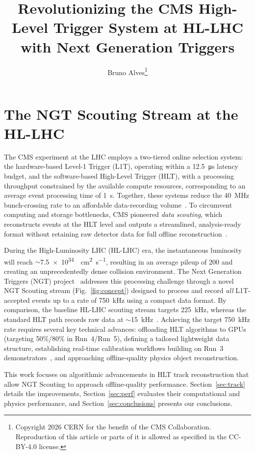 \documentclass[a4paper,11pt]{article}
\title{Revolutionizing the CMS High-Level Trigger System at HL-LHC with Next Generation Triggers}
\author[a]{Bruno Alves\orcidlink{0000-0001-9752-0624}\footnote{Copyright 2026 CERN for the benefit of the CMS Collaboration. Reproduction of this article or parts of it is allowed as specified in the CC-BY-4.0 license.}}
\affiliation[a]{CERN, 1211 Geneva 23, Switzerland}
\newcommand{\sm}{\ensuremath{\sim}}
\begin{document}
\maketitle

\section{The NGT Scouting Stream at the HL-LHC}
\label{intro}

The CMS experiment at the LHC employs a two-tiered online selection system: the hardware-based Level-1 Trigger (L1T), operating within a \SI{12.5}{\micro\second} latency budget, and the software-based High-Level Trigger (HLT), with a processing throughput constrained by the available compute resources, corresponding to an average event processing time of \SI{1}{\second}.
Together, these systems reduce the \SI{40}{\mega\hertz} bunch-crossing rate to an affordable data-recording volume~\cite{cms}.
To circumvent computing and storage bottlenecks, CMS pioneered \textit{data scouting}, which reconstructs events at the HLT level and outputs a streamlined, analysis-ready format without retaining raw detector data for full offline reconstruction~\cite{scout}. \par

During the High-Luminosity LHC (HL-LHC) era, the instantaneous luminosity will reach \sm\SI{7.5e34}{\per\square\centi\meter\per\second}, resulting in an average pileup of 200 and creating an unprecedentedly dense collision environment.
The Next Generation Triggers (NGT) project~\cite{ngt} addresses this processing challenge through a novel NGT Scouting stream (Fig.~\ref{fig:concept}) designed to process and record \emph{all} L1T-accepted events up to a rate of \SI{750}{\kilo\hertz} using a compact data format.
By comparison, the baseline HL-LHC scouting stream targets \SI{225}{\kilo\hertz}, whereas the standard HLT path records raw data at \sm\SI{15}{\kilo\hertz}~\cite{octdr}.
Achieving the target \SI{750}{\kilo\hertz} rate requires several key technical advances: offloading HLT algorithms to GPUs (targeting 50\%/80\% in Run~4/Run~5), defining a tailored lightweight data structure, establishing real-time calibration workflows building on Run~3 demonstrators~\cite{demonstrator}, and approaching offline-quality physics object reconstruction. \par

This work focuses on algorithmic advancements in HLT track reconstruction that allow NGT Scouting to approach offline-quality performance.
Section~\ref{sec:track} details the improvements, Section~\ref{sec:perf} evaluates their computational and physics performance, and Section~\ref{sec:conclusions} presents our conclusions.
\end{document}
